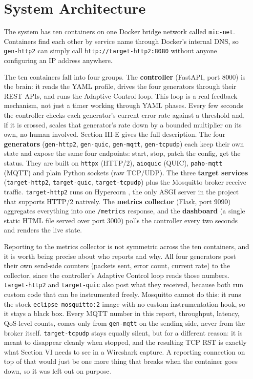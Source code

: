 \section{System Architecture}

The system has ten containers on one Docker bridge network called
\texttt{mic-net}. Containers find each other by service name through Docker's
internal DNS, so \texttt{gen-http2} can simply call
\texttt{http://target-http2:8080} without anyone configuring an IP address
anywhere.

The ten containers fall into four groups. The \textbf{controller} (FastAPI,
port 8000) is the brain: it reads the YAML profile, drives the four generators
through their REST APIs, and runs the Adaptive Control loop. This loop is a
real feedback mechanism, not just a timer working through YAML phases. Every
few seconds the controller checks each generator's current error rate against
a threshold and, if it is crossed, scales that generator's rate down by a
bounded multiplier on its own, no human involved. Section III-E gives the full
description. The four \textbf{generators} (\texttt{gen-http2}, \texttt{gen-quic},
\texttt{gen-mqtt}, \texttt{gen-tcpudp}) each keep their own state and expose
the same four endpoints: start, stop, patch the config, get the status. They
are built on \texttt{httpx} (HTTP/2), \texttt{aioquic} \cite{aioquic} (QUIC),
\texttt{paho-mqtt} \cite{pahomqtt} (MQTT) and plain Python sockets (raw
TCP/UDP). The three \textbf{target services} (\texttt{target-http2},
\texttt{target-quic}, \texttt{target-tcpudp}) plus the Mosquitto broker
\cite{mosquitto} receive traffic. \texttt{target-http2} runs on Hypercorn
\cite{hypercorn}, the only ASGI server in the project that supports HTTP/2
natively. The \textbf{metrics collector} (Flask, port 9090) aggregates
everything into one \texttt{/metrics} response, and the \textbf{dashboard}
(a single static HTML file served over port 3000) polls the controller every
two seconds and renders the live state.

Reporting to the metrics collector is not symmetric across the ten
containers, and it is worth being precise about who reports and why. All four
generators post their own send-side counters (packets sent, error count,
current rate) to the collector, since the controller's Adaptive Control loop
reads those numbers. \texttt{target-http2} and \texttt{target-quic} also post
what they received, because both run custom code that can be instrumented
freely. Mosquitto cannot do this: it runs the stock
\texttt{eclipse-mosquitto:2} image with no custom instrumentation hook, so it
stays a black box. Every MQTT number in this report, throughput, latency,
QoS-level counts, comes only from \texttt{gen-mqtt} on the sending side, never
from the broker itself. \texttt{target-tcpudp} stays equally silent, but for
a different reason: it is meant to disappear cleanly when stopped, and the
resulting TCP RST is exactly what Section VI needs to see in a Wireshark
capture. A reporting connection on top of that would just be one more thing
that breaks when the container goes down, so it was left out on purpose.

